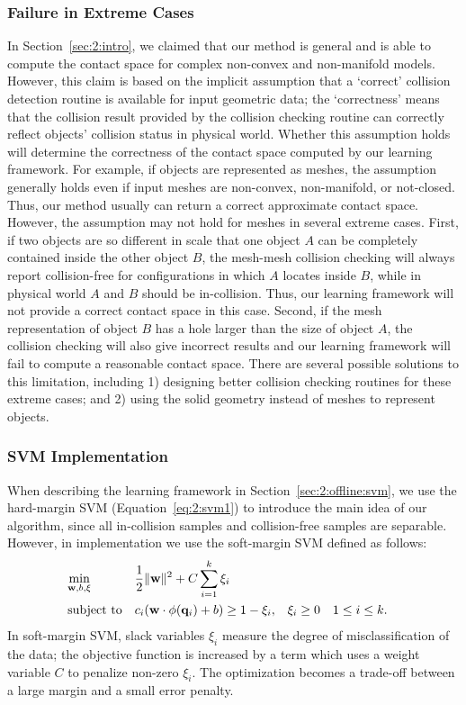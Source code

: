 \subsubsection{Failure in Extreme Cases}
In Section~\ref{sec:2:intro}, we claimed that our method is general and is able to compute the contact space for complex non-convex and non-manifold models. However, this claim is based on the implicit assumption that a `correct' collision detection routine is available for input geometric data; the `correctness' means that the collision result provided by the collision checking routine can correctly reflect objects' collision status in physical world. Whether this assumption holds will determine the correctness of the contact space computed by our learning framework. For example, if objects are represented as meshes, the assumption generally holds even if input meshes are non-convex, non-manifold, or not-closed. Thus, our method usually can return a correct approximate contact space. However, the assumption may not hold for meshes in several extreme cases. First, if two objects are so different in scale that one object $A$ can be completely contained inside the other object $B$, the mesh-mesh collision checking will always report collision-free for configurations in which $A$ locates inside $B$, while in physical world $A$ and $B$ should be in-collision. Thus, our learning framework will not provide a correct contact space in this case. Second, if the mesh representation of object $B$ has a hole larger than the size of object $A$, the collision checking will also give incorrect results and our learning framework will fail to compute a reasonable contact space. There are several possible solutions to this limitation, including 1) designing better collision checking routines for these extreme cases; and 2) using the solid geometry instead of meshes to represent objects.

\subsubsection{SVM Implementation}
When describing the learning framework in Section~\ref{sec:2:offline:svm}, we use the hard-margin SVM (Equation~\ref{eq:2:svm1}) to introduce the main idea of our algorithm, since all in-collision samples and collision-free samples are separable. However, in implementation we use the soft-margin SVM defined as follows:
\begin{align}
\label{eq:2:svmsoft}
& \underset{\mathbf w, b, \xi}{\text{min}} & & \frac{1}{2}\|\mathbf w\|^2 + C \sum_{i=1}^k \xi_i & &  \\
& \text{subject to} & & c_i (\mathbf w \cdot \phi(\mathbf q_i) + b)
\geq 1 - \xi_i, & & \xi_i \geq 0 & & 1 \leq i \leq k. \notag
\end{align}
In soft-margin SVM, slack variables $\xi_i$ measure the degree of misclassification of the data; the objective function is increased by a term which uses a weight variable $C$ to penalize non-zero $\xi_i$. The optimization becomes a trade-off between a large margin and a small error penalty. 

